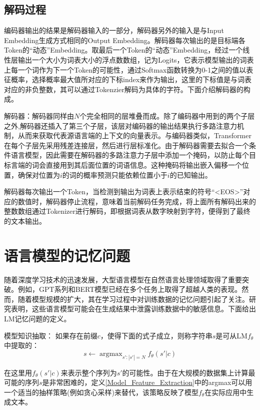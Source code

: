 \subsection{解码过程}

编码器输出的结果是解码器输入的一部分，解码器另外的输入是与Input Embedding生成方式相同的Output Embedding。解码器每次输出的是目标端各Token的“动态”Embedding。取最后一个Token的“动态”Embedding，经过一个线性层输出一个大小为词表大小的浮点数数组，记为Logits，它表示模型输出的词表上每一个词作为下一个Token的可能性，通过Softmax函数转换为0-1之间的值以表征概率，选择概率最大值所对应的下标index来作为输出，这里的下标值是与词表对应的非负整数，其可以通过Tokenzier解码为具体的字符。下面介绍解码器的构成。

解码器：解码器同样由$N$个完全相同的层堆叠而成。除了编码器中用到的两个子层之外,解码器还插入了第三个子层，该层对编码器的输出结果执行多路注意力机制，从而来获取代表源语言端的上下文的向量表示。与编码器类似，Transformer在每个子层先采用残差连接层，然后进行层标准化。由于解码器需要去拟合一个条件语言模型，因此需要在解码器的多路注意力子层中添加一个掩码，以防止每个目标言端的词会直接用到其后面位置的词语信息。这种掩码将输出嵌入偏移一个位置，确保对位置为$i$的词的概率预测只能依赖位置小于$i$的已知输出。

解码器每次输出一个Token，当检测到输出为词表上表示结束的符号“<EOS>”对应的数值时，解码器停止流程，意味着当前解码任务完成，将上面所有解码出来的整数数组通过Tokenizer进行解码，即根据词表从数字映射到字符，便得到了最终的文本输出。

\section{语言模型的记忆问题}

随着深度学习技术的迅速发展，大型语言模型在自然语言处理领域取得了重要突破。例如，GPT系列\cite{GPT2, GPT3}和BERT\cite{BERT}模型已经在多个任务上取得了超越人类的表现。然而，随着模型规模的扩大，其在学习过程中对训练数据的记忆问题引起了关注。研究表明\cite{Extrac_Train_Data_From_LM}，这些语言模型可能会在生成结果中泄露训练数据中的敏感信息。下面给出LM记忆问题的定义。

\begin{definition}{模型知识抽取：}
	如果存在前缀$c$，使得下面的式子成立，则称字符串$s$是可从LM$f_\theta$中提取的：
	$$s\leftarrow \mathop{argmax}_{s':|s'|=N} f_\theta(s'|c)$$
	\label{Model_Feature_Extraction}
\end{definition}

在这里用$f_\theta (s'|c)$来表示整个序列为$s'$的可能性。由于在大规模的数据集上计算最可能的序列$s$是非常困难的，定义\ref{Model_Feature_Extraction}中的argmax可以用一个适当的抽样策略(例如贪心采样)来替代，该策略反映了模型$f_\theta$在实际应用中生成文本。

